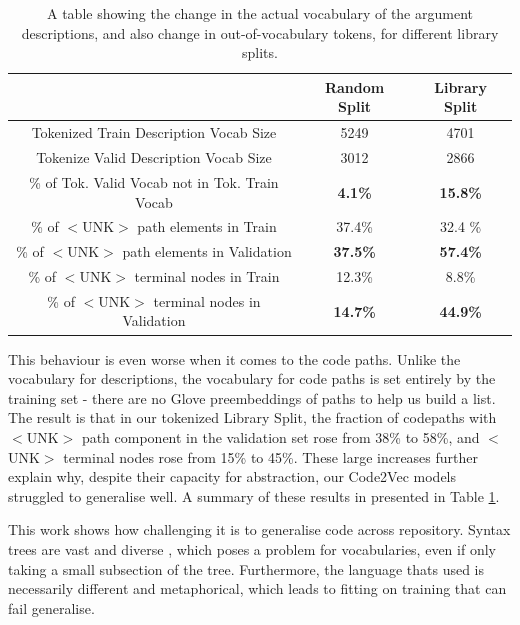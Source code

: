 \begin{table}
    \begin{center}
        \begin{tabular}{c c c}
           \hline
            & Random Split & Library Split \\
            \hline
            Tokenized Train Description Vocab Size    & 5249  &  4701 \\
            Tokenize Valid Description Vocab Size    & 3012  &  2866 \\
            \% of Tok. Valid Vocab not in Tok. Train Vocab                & \textbf{4.1\%} &  \textbf{15.8\%} \\
            \hline
            \% of $<$UNK$>$ path elements in Train          &  37.4\%  &  32.4 \%   \\
            \% of $<$UNK$>$ path elements in Validation     &  \textbf{37.5\%}  &  \textbf{57.4\%} \\
            \% of $<$UNK$>$ terminal nodes in Train         &  12.3\%  &  8.8\%  \\ 
            \% of $<$UNK$>$ terminal nodes in Validation    &  \textbf{14.7\%} &  \textbf{44.9\%} \\   
            \hline
        \end{tabular}
    \end{center}
    \caption{A table showing the change in the actual vocabulary of the argument descriptions, and also change in out-of-vocabulary tokens, for different library splits.}
    \label{tab:vocabsplit}
\end{table}



This behaviour is even worse when it comes to the code paths.
Unlike the vocabulary for descriptions, the  vocabulary for code paths is set entirely by the training set - there are no Glove preembeddings of paths to help us build a list. The result is that in our tokenized Library Split, the fraction of codepaths with $<$UNK$>$ path component in the validation set rose from 38\% to 58\%, and $<$UNK$>$ terminal nodes rose from 15\% to 45\%. 
These large increases further explain why, despite their capacity for abstraction, our Code2Vec models struggled to generalise well. A summary of these results in presented in Table \ref{tab:vocabsplit}.

This work shows how challenging it is to generalise code across repository. Syntax trees are vast and diverse \citep{allamanis_survey_2017}, which poses a problem for vocabularies, even if only taking a small subsection of the tree. 
Furthermore, the language thats used is necessarily different and metaphorical, which leads to fitting on training that can fail generalise.

